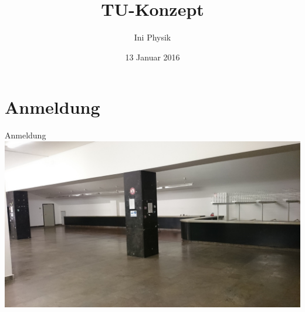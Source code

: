 \documentclass[compress,]{beamer}
\title[TU-Konzept]{TU-Konzept}
\author{Ini Physik}
\institute[TU Berlin]
\begin{document}
\subject{Konzept an der TU}
\date{13 Januar 2016}

\begin{frame}
\titlepage
\end{frame}


\frame{\tableofcontents}

\section{Anmeldung}
\begin{frame}{Anmeldung}
  \includegraphics[width=\textwidth]{images/anmeldung.JPG}
\end{frame}
\end{document}
